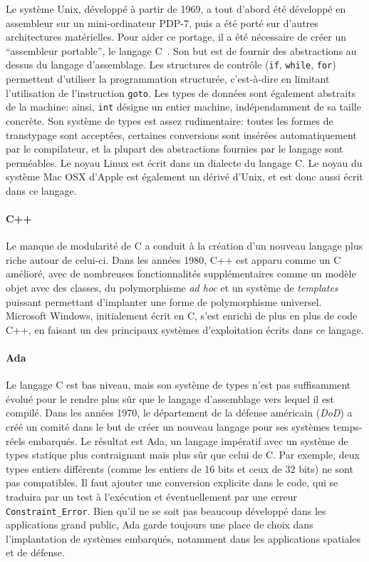 Le système Unix, développé à partir de 1969, a tout d'abord été développé en
assembleur sur un mini-ordinateur PDP-7, puis a été porté sur d'autres
architectures matérielles. Pour aider ce portage, il a été nécessaire de créer
un ``assembleur portable'', le langage C~\cite{KandR,AnsiC}. Son but est de
fournir des abstractions au dessus du langage d'assemblage. Les structures de
contrôle (\texttt{if}, \texttt{while}, \texttt{for}) permettent d'utiliser la
programmation structurée, c'est-à-dire en limitant l'utilisation de
l'instruction \texttt{goto}. Les types de données sont également abstraits de la
machine: ainsi, \texttt{int} désigne un entier machine, indépendamment de sa
taille concrète. Son système de types est assez rudimentaire: toutes les formes
de transtypage sont acceptées, certaines conversions sont insérées
automatiquement par le compilateur, et la plupart des abstractions fournies par
le langage sont perméables. Le noyau Linux est écrit dans un dialecte du langage
C. Le noyau du système Mac OSX d'Apple est également un dérivé d'Unix, et est
donc aussi écrit dans ce langage.

\paragraph{C++}

Le manque de modularité de C a conduit à la création d'un nouveau langage plus
riche autour de celui-ci. Dans les années 1980, C++ est apparu comme un C
amélioré, avec de nombreuses fonctionnalités supplémentaires comme un modèle
objet avec des classes, du polymorphisme \emph{ad hoc} et un système de
\emph{templates} puissant permettant d'implanter une forme de polymorphisme
universel. Microsoft Windows, initialement écrit en C, s'est enrichi de plus en
plus de code C++, en faisant un des principaux systèmes d'exploitation écrits
dans ce langage.

\paragraph{Ada}

Le langage C est bas niveau, mais son système de types n'est pas suffisamment
évolué pour le rendre plus sûr que le langage d'assemblage vers lequel il est
compilé. Dans les années 1970, le département de la défense américain
(\emph{DoD}) a créé un comité dans le but de créer un nouveau langage pour ses
systèmes temps-réels embarqués. Le résultat est Ada, un langage impératif avec
un système de types statique plus contraignant mais plus sûr que celui de C. Par
exemple, deux types entiers différents (comme les entiers de 16 bits et ceux de
32 bits) ne sont pas compatibles. Il faut ajouter une conversion explicite dans
le code, qui se traduira par un test à l'exécution et éventuellement par une
erreur \texttt{Constraint\_Error}. Bien qu'il ne se soit pas beaucoup développé
dans les applications grand public, Ada garde toujours une place de choix dans
l'implantation de systèmes embarqués, notamment dans les applications spatiales
et de défense.

